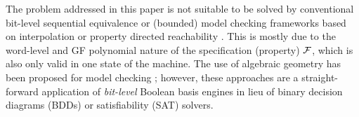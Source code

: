 The problem addressed in this paper is not suitable to be
solved by conventional bit-level sequential equivalence
\cite{coudert:iccad90} or (bounded) model checking frameworks
based on interpolation \cite{mcmillan:interpolation_cav03} or property
directed reachability \cite{IC3}. This is mostly due to the word-level
and GF polynomial nature of the specification (property) ${\mathcal{F}}$, which 
is also only valid in one state of the machine. The use of algebraic
geometry has been proposed for model checking 
\cite{Avrunin:CAV} \cite{Vardi:gb_bool_ring} \cite{polybori:2009};
however, these approaches are a straight-forward application of {\it
  bit-level} Boolean \Grobner basis engines in lieu of binary decision diagrams (BDDs) or 
  satisfiability (SAT)
solvers.  

